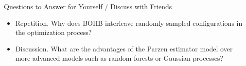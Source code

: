 \begin{frame}{Questions to Answer for Yourself / Discuss with Friends}

\bigskip

\begin{itemize}
    \item \alert{Repetition.} Why does BOHB interleave randomly sampled configurations in the optimization process?

\medskip
    \item \alert{Discussion.} 
    What are the advantages of the Parzen estimator model over more advanced models such as random forests or Gaussian processes?

\end{itemize}

\end{frame}
